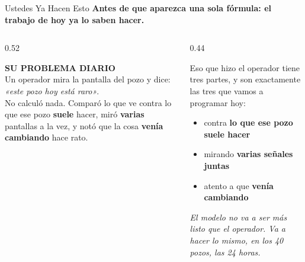 \documentclass[aspectratio=169, 11pt]{beamer}
\begin{document}
\begin{frame}[shrink=6]{Ustedes Ya Hacen Esto}
  \vspace{-4pt}
  {\small\color{arcaDark}\bfseries
   Antes de que aparezca una sola fórmula: el trabajo de hoy ya lo saben hacer.}
  \vspace{8pt}
  \begin{columns}[T]
    \begin{column}{0.52\textwidth}
      \begin{tcolorbox}[colback=arcaGray, colframe=arcaRed, boxrule=0pt, leftrule=3pt,
        arc=3pt, left=6pt, right=6pt, top=5pt, bottom=5pt]
        {\scriptsize\color{arcaRed}\bfseries\faUserCog\hspace{4pt}SU PROBLEMA DIARIO}\\[4pt]
        {\scriptsize\color{textMuted}
         Un operador mira la pantalla del pozo y dice:
         \textit{«este pozo hoy está raro»}.\\[4pt]
         No calculó nada. Comparó lo que ve contra lo que ese pozo
         \textbf{suele} hacer, miró \textbf{varias} pantallas a la vez,
         y notó que la cosa \textbf{venía cambiando} hace rato.}
      \end{tcolorbox}
    \end{column}
    \begin{column}{0.44\textwidth}
      {\footnotesize\color{textMuted}
      Eso que hizo el operador tiene tres partes, y son exactamente
      las tres que vamos a programar hoy:
      \vspace{6pt}
      \begin{itemize}\setlength{\itemsep}{5pt}
        \item[{\color{arcaRed}\scriptsize\faArrowRight}]
          contra \textbf{lo que ese pozo suele hacer}
        \item[{\color{arcaRed}\scriptsize\faArrowRight}]
          mirando \textbf{varias señales juntas}
        \item[{\color{arcaRed}\scriptsize\faArrowRight}]
          atento a que \textbf{venía cambiando}
      \end{itemize}
      }
      \vspace{6pt}
      {\scriptsize\color{arcaDark}\itshape
        El modelo no va a ser más listo que el operador.
        Va a hacer lo mismo, en los 40 pozos, las 24 horas.}
    \end{column}
  \end{columns}
\end{frame}
\end{document}
